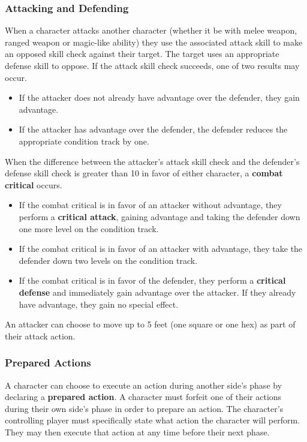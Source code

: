 \documentclass[11pt]{article}
\begin{document}
\subsubsection{Attacking and Defending}
When a character attacks another character (whether it be with melee weapon, ranged weapon or magic-like ability) they use the associated attack skill to make an opposed skill check against their target.
The target uses an appropriate defense skill to oppose.
If the attack skill check succeeds, one of two results may occur.

\begin{itemize}
	\item If the attacker does not already have advantage over the defender, they gain advantage.
	\item If the attacker has advantage over the defender, the defender reduces the appropriate  condition track by one.
\end{itemize}

When the difference between the attacker's attack skill check and the defender's defense skill check is greater than 10 in favor of either character, a \textbf{combat critical} occurs.

\begin{itemize}
	\item If the combat critical is in favor of an attacker without advantage, they perform a \textbf{critical attack}, gaining advantage and taking the defender down one more level on the condition track.
	\item If the combat critical is in favor of an attacker with advantage, they take the defender down two levels on the condition track.
	\item If the combat critical is in favor of the defender, they perform a \textbf{critical defense} and immediately gain advantage over the attacker. If they already have advantage, they gain no special effect.
\end{itemize}

An attacker can choose to move up to 5 feet (one square or one hex) as part of their attack action.

\subsubsection{Prepared Actions}
A character can choose to execute an action during another side's phase by declaring a \textbf{prepared action}.
A character must forfeit one of their actions during their own side's phase in order to prepare an action.
The character's controlling player must specifically state what action the character will perform.
They may then execute that action at any time before their next phase.
\end{document}
